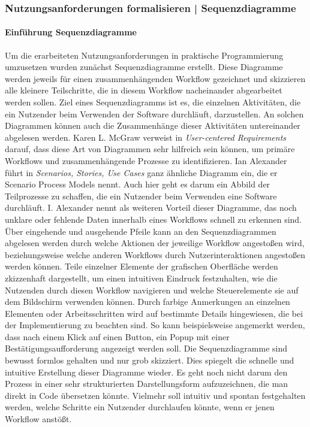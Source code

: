 \subsubsection{Nutzungsanforderungen formalisieren | Sequenzdiagramme}
\label{subsection:sequenceDiagrams}

\paragraph{Einführung Sequenzdiagramme}
Um die erarbeiteten Nutzungsanforderungen in praktische Programmierung
umzusetzen wurden zunächst Sequenzdiagramme erstellt. Diese Diagramme werden
jeweils für einen zusammenhängenden Workflow gezeichnet und skizzieren alle
kleinere Teilschritte, die in diesem Workflow nacheinander abgearbeitet werden
sollen. Ziel eines Sequenzdiagramms ist es, die einzelnen Aktivitäten, die ein
Nutzender beim Verwenden der Software durchläuft,
darzustellen.\cite{holtzblattCDEvolved} An solchen Diagrammen können auch die
Zusammenhänge dieser Aktivitäten untereinander abgelesen werden. Karen L.
McGraw verweist in \textit{User-centered Requirements} darauf, dass diese Art
von Diagrammen sehr hilfreich sein können, um primäre Workflows und
zusammenhängende Prozesse zu identifizieren\cite{sequenceDiagrams}. Ian
Alexander führt in \textit{Scenarios, Stories, Use Cases} ganz ähnliche
Diagramm ein, die er Scenario Process Models nennt. Auch hier geht es darum ein
Abbild der Teilprozesse zu schaffen, die ein Nutzender beim Verwenden eine
Software durchläuft. I. Alexander nennt als weiteren Vorteil dieser Diagramme,
das noch unklare oder fehlende Daten innerhalb eines Workflows schnell zu
erkennen sind. Über eingehende und ausgehende Pfeile kann an den
Sequenzdiagrammen abgelesen werden durch welche Aktionen der jeweilige Workflow
angestoßen wird, beziehungsweise welche anderen Workflows durch
Nutzerinteraktionen angestoßen werden können. Teile einzelner Elemente der
grafischen Oberfläche werden zkizzenhaft dargestellt, um einen intuitiven
Eindruck festzuhalten, wie die Nutzenden durch diesen Workflow navigieren und
welche Steuerelemente sie auf dem Bildschirm verwenden können. Durch farbige
Anmerkungen an einzelnen Elementen oder Arbeitsschritten wird auf bestimmte
Details hingewiesen, die bei der Implementierung zu beachten sind. So kann
beispielsweise angemerkt werden, dass nach einem Klick auf einen Button, ein
Popup mit einer Bestätigungsaufforderung angezeigt werden soll. Die
Sequenzdiagramme sind bewusst formlos gehalten und nur grob skizziert. Dies
spiegelt die schnelle und intuitive Erstellung dieser Diagramme wieder. Es geht
noch nicht darum den Prozess in einer sehr strukturierten Darstellungsform
aufzuzeichnen, die man direkt in Code übersetzen könnte. Vielmehr soll intuitiv
und spontan festgehalten werden, welche Schritte ein Nutzender durchlaufen
könnte, wenn er jenen Workflow anstößt.

